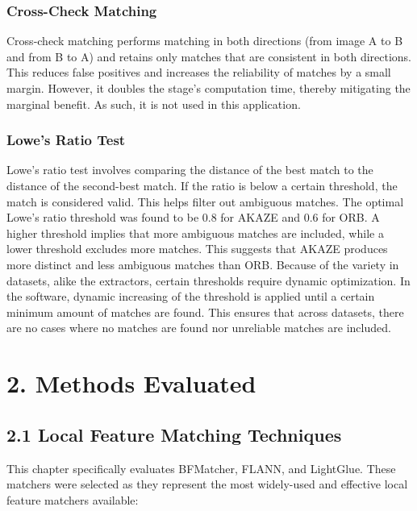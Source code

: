\subsubsection*{Cross-Check Matching}

Cross-check matching performs matching in both directions (from image A to B and from B to A) and retains only matches that are consistent in both directions. This reduces false positives and increases the reliability of matches by a small margin. However, it doubles the stage's computation time, thereby mitigating the marginal benefit. As such, it is not used in this application.

\subsubsection*{Lowe's Ratio Test}

Lowe's ratio test involves comparing the distance of the best match to the distance of the second-best match. If the ratio is below a certain threshold, the match is considered valid. This helps filter out ambiguous matches. The optimal Lowe's ratio threshold was found to be 0.8 for AKAZE and 0.6 for ORB. A higher threshold implies that more ambiguous matches are included, while a lower threshold excludes more matches. This suggests that AKAZE produces more distinct and less ambiguous matches than ORB. Because of the variety in datasets, alike the extractors, certain thresholds require dynamic optimization. In the software, dynamic increasing of the threshold is applied until a certain minimum amount of matches are found. This ensures that across datasets, there are no cases where no matches are found nor unreliable matches are included.



\section*{2. Methods Evaluated}

\subsection*{2.1 Local Feature Matching Techniques}

This chapter specifically evaluates BFMatcher, FLANN, and LightGlue. These matchers were selected as they represent the most widely-used and effective local feature matchers available:

